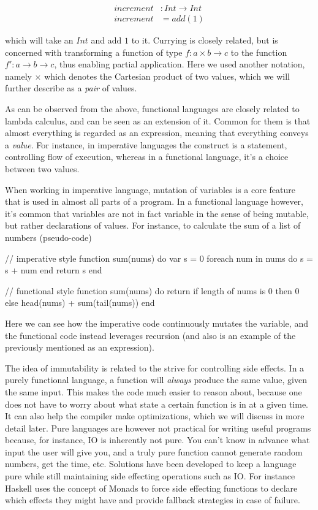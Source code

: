 \begin{align*}
increment &: Int \to Int\\
increment &= add(1)
\end{align*}

which will take an $Int$ and add $1$ to it. Currying is closely related, but is concerned with transforming a function of type $f : a \times b \to c$ to the function $f' : a \to b \to c$, thus enabling partial application. Here we used another notation, namely $\times$ which denotes the Cartesian product of two values, which we will further describe as a \emph{pair} of values.

As can be observed from the above, functional languages are closely related to lambda calculus, and can be seen as an extension of it. Common for them is that almost everything is regarded as an expression, meaning that everything conveys a \emph{value}. For instance, in imperative languages the  construct is a statement, controlling flow of execution, whereas in a functional language, it's a choice between two values.

When working in imperative language, mutation of variables is a core feature that is used in almost all parts of a program. In a functional language however, it's common that variables are not in fact variable in the sense of being mutable, but rather declarations of values. For instance, to calculate the sum of a list of numbers (pseudo-code)

\begin{pseudo}

// imperative style
function sum(nums) do
  var s = 0
  foreach num in nums do
    s = s + num
  end
  return s
end

// functional style
function sum(nums) do
  return if length of nums is 0
    then 0
    else head(nums) + sum(tail(nums))
end
\end{pseudo}

Here we can see how the imperative code continuously mutates the  variable, and the functional code instead leverages recursion (and also is an example of the previously mentioned  as an expression).

The idea of immutability is related to the strive for controlling side effects. In a purely functional language, a function will \emph{always} produce the same value, given the same input. This makes the code much easier to reason about, because one does not have to worry about what state a certain function is in at a given time. It can also help the compiler make optimizations, which we will discuss in more detail later. Pure languages are however not practical for writing useful programs because, for instance, IO is inherently not pure. You can't know in advance what input the user will give you, and a truly pure function cannot generate random numbers, get the time, etc. Solutions have been developed to keep a language pure while still maintaining side effecting operations such as IO. For instance Haskell uses the concept of Monads to force side effecting functions to declare which effects they might have and provide fallback strategies in case of failure.


